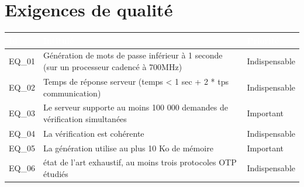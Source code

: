 \documentclass{"../../res/univ-projet"}
\begin{document}
\section{Exigences de qualité}
\begin{tabular}{|p{}|p{}|p{}|}
    \hline
    \rowcolor{gray}
    \textcolor{white}{Id} & \textcolor{white}{Intitulé} & \textcolor{white}{Priorité}\\
    \hline
    EQ\_01 & Génération de mots de passe inférieur à 1 seconde (sur un processeur cadencé à 700MHz) & Indispensable\\
    \hline
    EQ\_02 & Temps de réponse serveur (temps < 1 sec + 2 * tps communication) & Indispensable\\
    \hline
    EQ\_03 & Le serveur supporte au moins 100 000 demandes de vérification simultanées & Important\\
    \hline
    EQ\_04 & La vérification est cohérente & Indispensable\\
    \hline
    EQ\_05 & La génération utilise au plus 10 Ko de mémoire & Important\\
    \hline
    EQ\_06 & état de l'art exhaustif, au moins trois protocoles OTP étudiés & Indispensable\\
    \hline
\end{tabular}
\end{document}
